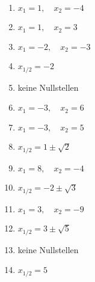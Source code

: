 \newpage
\begin{Answer}[ref=normalformNullstellenA1]

	\begin{minipage}{\textwidth}
		\begin{minipage}{0.49\textwidth}
			\begin{enumerate}[label=\alph*)]
				\item \(x_1=1,\quad x_2=-4\)
				\item \(x_1=1,\quad x_2=3\)
				\item \(x_1=-2,\quad x_2=-3\)
				\item \(x_{1/2}=-2\)
				\item keine Nullstellen
				\item \(x_1=-3,\quad x_2=6\)
				\item \(x_1=-3,\quad x_2=5\)
			\end{enumerate}
		\end{minipage}
		\begin{minipage}{0.49\textwidth}
			\begin{enumerate}[label=\alph*)]
				\setcounter{enumi}{7}
				\item \(x_{1/2}=1\pm\sqrt{2}\)
				\item \(x_1=8,\quad x_2=-4\)
				\item \(x_{1/2}=-2\pm\sqrt{3}\)
				\item \(x_1=3,\quad x_2=-9\)
				\item \(x_{1/2}=3\pm\sqrt{5}\)
				\item keine Nullstellen
				\item \(x_{1/2}=5\)
			\end{enumerate}
		\end{minipage}
	\end{minipage}
\end{Answer}